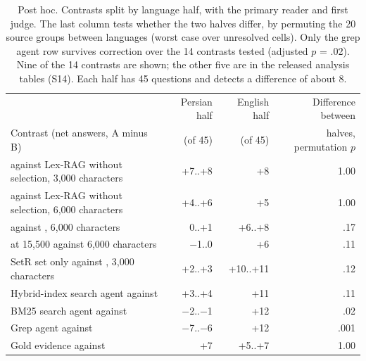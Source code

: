 \begin{table}[t]
\centering
\small
\setlength{\tabcolsep}{5pt}
\begin{tabular}{@{}lrrr@{}}
\toprule
 & Persian half & English half & Difference between \\
Contrast (net answers, A minus B) & (of 45) & (of 45) & halves, permutation $p$ \\
\midrule
\lexb{} against Lex-RAG without selection, 3,000 characters & +7..+8 & +8 & 1.00 \\
\lexb{} against Lex-RAG without selection, 6,000 characters & +4..+6 & +5 & 1.00 \\
\hr{} against \hybrid{}, 6,000 characters & 0..+1 & +6..+8 & .17 \\
\hybrid{} at 15,500 against 6,000 characters & $-$1..0 & +6 & .11 \\
SetR set only against \hybrid{}, 3,000 characters & +2..+3 & +10..+11 & .12 \\
Hybrid-index search agent against \hybrid{} & +3..+4 & +11 & .11 \\
BM25 search agent against \hybrid{} & $-$2..$-$1 & +12 & .02 \\
Grep agent against \hybrid{} & $-$7..$-$6 & +12 & .001 \\
Gold evidence against \hr{} & +7 & +5..+7 & 1.00 \\
\bottomrule
\end{tabular}
\caption{Post hoc. Contrasts split by language half, with the primary reader and first judge. The last column tests whether the two halves differ, by permuting the 20 source groups between languages (worst case over unresolved cells). Only the grep agent row survives correction over the 14 contrasts tested (adjusted $p$ = .02). Nine of the 14 contrasts are shown; the other five are in the released analysis tables (S14). Each half has 45 questions and detects a difference of about 8.}
\label{tab:replication}
\end{table}
